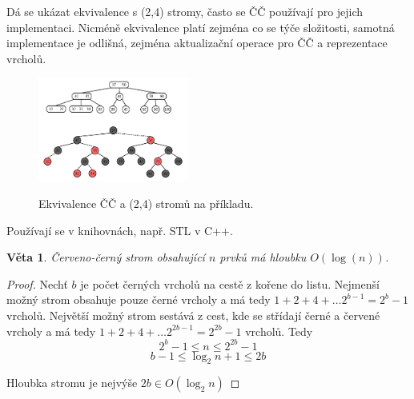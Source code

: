 \documentclass[11pt]{report} %
\newtheorem{theorem}{Věta}[section]
\numberwithin{equation}{section}
\begin{document}
Dá se ukázat ekvivalence s (2,4) stromy, často se ČČ používají pro jejich implementaci. Nicméně ekvivalence platí zejména co se týče složitosti, samotná implementace je odlišná, zejména aktualizační operace pro ČČ a reprezentace vrcholů.
\begin{figure}[H]
	\centering
	\includegraphics[width=0.44\textwidth]{img/rbtree_24tree.jpg}
	\label{rb24}
	\caption{Ekvivalence ČČ a (2,4) stromů na příkladu.}
\end{figure}

Používají se v knihovnách, např. STL v C++.

\begin{theorem}
	Červeno-černý strom obsahující $n$ prvků má hloubku $O(\log (n))$.
\end{theorem}
\begin{proof}
	Nechť $b$ je počet černých vrcholů na cestě z kořene do listu. Nejmenší možný strom obsahuje pouze černé vrcholy a má tedy $1 + 2 + 4 + \dots 2^{b-1} = 2^{b} - 1$ vrcholů. Největší možný strom sestává z cest, kde se střídají černé a červené vrcholy a má tedy $1 + 2 + 4 + \dots 2^{2b-1} = 2^{2b} - 1$ vrcholů. Tedy
	$$2^b - 1 \leq n \leq 2^{2b} -1$$
	$$b - 1 \leq \log_2 n + 1\leq 2b$$
	
	Hloubka stromu je nejvýše $2b \in O(\log_2 n)$
\end{proof}
\end{document}
